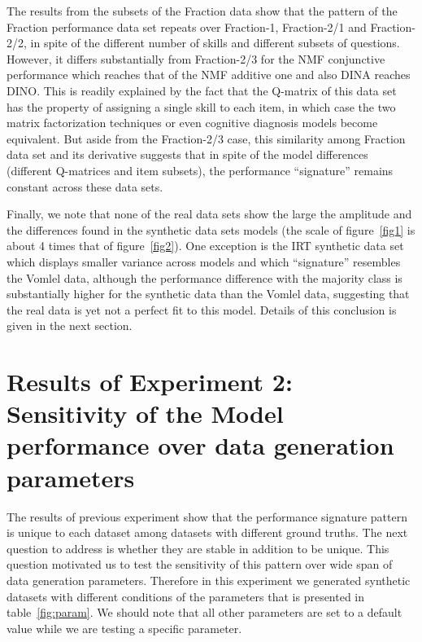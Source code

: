 

The results from the subsets of the Fraction data show that the pattern of the Fraction performance data set repeats over Fraction-1, Fraction-2/1 and Fraction-2/2, in spite of the different number of skills and different subsets of questions.  However, it differs substantially from Fraction-2/3 for the NMF conjunctive performance which reaches that of the NMF additive one and also DINA reaches DINO. This is readily explained by the fact that the Q-matrix of this data set has the property of assigning a single skill to each item, in which case the two matrix factorization techniques or even cognitive diagnosis models become equivalent.  But aside from the Fraction-2/3 case, this similarity among Fraction data set and its derivative suggests that in spite of the model differences (different Q-matrices and item subsets), the performance ``signature'' remains constant across these data sets.

Finally, we note that none of the real data sets show the large the amplitude and the differences found in the synthetic data sets models (the scale of figure~\ref{fig1} is about 4 times that of figure~\ref{fig2}). One exception is the IRT synthetic data set which displays smaller variance across models and which ``signature'' resembles the Vomlel data, although the performance difference with the majority class is substantially higher for the synthetic data than the Vomlel data, suggesting that the real data is yet not a perfect fit to this model. Details of this conclusion is given in the next section.


\section{Results of Experiment 2: Sensitivity of the Model performance over data generation parameters}
\label{Sensitive}

The results of previous experiment show that the performance signature pattern is unique to each dataset among datasets with different ground truths. The next question to address is whether they are stable in addition to be unique.  This question motivated us to test the sensitivity of this pattern over wide span of data generation parameters. Therefore in this experiment we generated synthetic datasets with different conditions of the parameters that is presented in table~\ref{fig:param}. We should note that all other parameters are set to a default value while we are testing a specific parameter.

